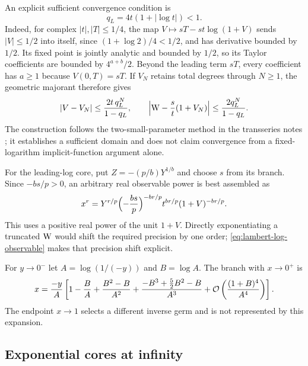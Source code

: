 An explicit sufficient convergence condition is
\begin{equation}
 q_L=4t(1+|\log t|)<1.
 \label{eq:lambert-convergence-condition}
\end{equation}
Indeed, for complex $|t|,|T|\le1/4$, the map $V\mapsto sT-s t\log(1+V)$ sends $|V|\le1/2$ into itself, since $(1+\log2)/4<1/2$, and has derivative bounded by $1/2$. Its fixed point is jointly analytic and bounded by $1/2$, so its Taylor coefficients are bounded by $4^{a+b}/2$. Beyond the leading term $sT$, every coefficient has $a\ge1$ because $V(0,T)=sT$. If $V_N$ retains total degrees through $N\ge1$, the geometric majorant therefore gives
\begin{equation}
 |V-V_N|\le\frac{2t\,q_L^N}{1-q_L},\qquad
 \left|\mathrm W-\frac{s}{t}(1+V_N)\right|
 \le\frac{2q_L^N}{1-q_L}.
 \label{eq:lambert-explicit-tail}
\end{equation}
The construction follows the two-small-parameter method in the transseries notes \cite{proveit}; it establishes a sufficient domain and does not claim convergence from a fixed-logarithm implicit-function argument alone.

For the leading-log core, put $Z=-(p/b)Y^{1/b}$ and choose $s$ from its branch. Since $-bs/p>0$, an arbitrary real observable power is best assembled as
\begin{equation}
 x^r=Y^{r/p}\Bigl(-\frac{bs}{p}\Bigr)^{-br/p}
 t^{br/p}(1+V)^{-br/p}.
 \label{eq:lambert-log-observable}
\end{equation}
This uses a positive real power of the unit $1+V$. Directly exponentiating a truncated $\mathrm W$ would shift the required precision by one order; \eqref{eq:lambert-log-observable} makes that precision shift explicit.

\begin{example}
For $y\to0^-$ let $A=\log(1/(-y))$ and $B=\log A$. The branch with $x\to0^+$ is
\[
 x=\frac{-y}{A}\left[1-\frac{B}{A}
 +\frac{B^2-B}{A^2}
 +\frac{-B^3+\tfrac52B^2-B}{A^3}
 +\mathcal O\left(\frac{(1+B)^4}{A^4}\right)\right].
\]
The endpoint $x\to1$ selects a different inverse germ and is not represented by this expansion.
\end{example}

\subsection{Exponential cores at infinity}

